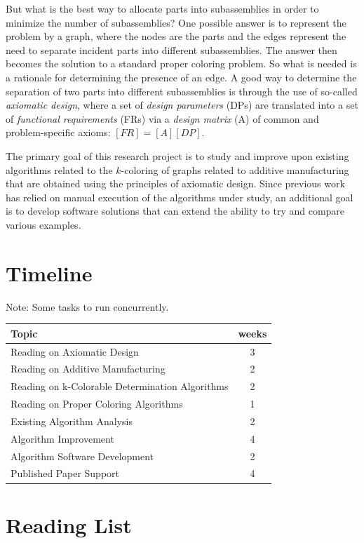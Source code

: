 \documentclass[letterpaper,12pt]{article}
\begin{document}
But what is the best way to allocate parts into subassemblies in order to minimize the number of subassemblies?  One possible
answer is to represent the problem by a graph, where the nodes are the parts and the edges represent the need to separate
incident parts into different subassemblies.  The answer then becomes the solution to a standard proper coloring problem.  So
what is needed is a rationale for determining the presence of an edge.  A good way to determine the separation of two parts
into different subassemblies is through the use of so-called \emph{axiomatic design}, where a set of \emph{design parameters}
(DPs) are translated into a set of \emph{functional requirements} (FRs) via a \emph{design matrix} (A) of common and
problem-specific axioms: \([FR]=[A][DP]\).

The primary goal of this research project is to study and improve upon existing algorithms related to the \(k\)-coloring of
graphs related to additive manufacturing that are obtained using the principles of axiomatic design.  Since previous work has
relied on manual execution of the algorithms under study, an additional goal is to develop software solutions that can extend
the ability to try and compare various examples.

\section*{Timeline}

Note: Some tasks to run concurrently.

\begin{tabular}{|l|c|}
  \hline
  \textbf{Topic} & \textbf{weeks} \\
  \hline
  Reading on Axiomatic Design & 3 \\
  Reading on Additive Manufacturing & 2 \\
  Reading on k-Colorable Determination Algorithms & 2 \\
  Reading on Proper Coloring Algorithms & 1 \\
  Existing Algorithm Analysis & 2 \\
  Algorithm Improvement & 4 \\
  Algorithm Software Development & 2 \\
  Published Paper Support & 4 \\
  \hline
\end{tabular}

\section*{Reading List}
\end{document}
